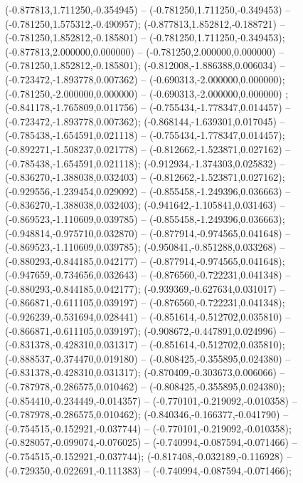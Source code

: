  (-0.877813,1.711250,-0.354945) -- (-0.781250,1.711250,-0.349453) -- (-0.781250,1.575312,-0.490957);
 (-0.877813,1.852812,-0.188721) -- (-0.781250,1.852812,-0.185801) -- (-0.781250,1.711250,-0.349453);
 (-0.877813,2.000000,0.000000) -- (-0.781250,2.000000,0.000000) -- (-0.781250,1.852812,-0.185801);
 (-0.812008,-1.886388,0.006034) -- (-0.723472,-1.893778,0.007362) -- (-0.690313,-2.000000,0.000000);
 (-0.781250,-2.000000,0.000000) -- (-0.690313,-2.000000,0.000000) ;
 (-0.841178,-1.765809,0.011756) -- (-0.755434,-1.778347,0.014457) -- (-0.723472,-1.893778,0.007362);
 (-0.868144,-1.639301,0.017045) -- (-0.785438,-1.654591,0.021118) -- (-0.755434,-1.778347,0.014457);
 (-0.892271,-1.508237,0.021778) -- (-0.812662,-1.523871,0.027162) -- (-0.785438,-1.654591,0.021118);
 (-0.912934,-1.374303,0.025832) -- (-0.836270,-1.388038,0.032403) -- (-0.812662,-1.523871,0.027162);
 (-0.929556,-1.239454,0.029092) -- (-0.855458,-1.249396,0.036663) -- (-0.836270,-1.388038,0.032403);
 (-0.941642,-1.105841,0.031463) -- (-0.869523,-1.110609,0.039785) -- (-0.855458,-1.249396,0.036663);
 (-0.948814,-0.975710,0.032870) -- (-0.877914,-0.974565,0.041648) -- (-0.869523,-1.110609,0.039785);
 (-0.950841,-0.851288,0.033268) -- (-0.880293,-0.844185,0.042177) -- (-0.877914,-0.974565,0.041648);
 (-0.947659,-0.734656,0.032643) -- (-0.876560,-0.722231,0.041348) -- (-0.880293,-0.844185,0.042177);
 (-0.939369,-0.627634,0.031017) -- (-0.866871,-0.611105,0.039197) -- (-0.876560,-0.722231,0.041348);
 (-0.926239,-0.531694,0.028441) -- (-0.851614,-0.512702,0.035810) -- (-0.866871,-0.611105,0.039197);
 (-0.908672,-0.447891,0.024996) -- (-0.831378,-0.428310,0.031317) -- (-0.851614,-0.512702,0.035810);
 (-0.888537,-0.374470,0.019180) -- (-0.808425,-0.355895,0.024380) -- (-0.831378,-0.428310,0.031317);
 (-0.870409,-0.303673,0.006066) -- (-0.787978,-0.286575,0.010462) -- (-0.808425,-0.355895,0.024380);
 (-0.854410,-0.234449,-0.014357) -- (-0.770101,-0.219092,-0.010358) -- (-0.787978,-0.286575,0.010462);
 (-0.840346,-0.166377,-0.041790) -- (-0.754515,-0.152921,-0.037744) -- (-0.770101,-0.219092,-0.010358);
 (-0.828057,-0.099074,-0.076025) -- (-0.740994,-0.087594,-0.071466) -- (-0.754515,-0.152921,-0.037744);
 (-0.817408,-0.032189,-0.116928) -- (-0.729350,-0.022691,-0.111383) -- (-0.740994,-0.087594,-0.071466);
